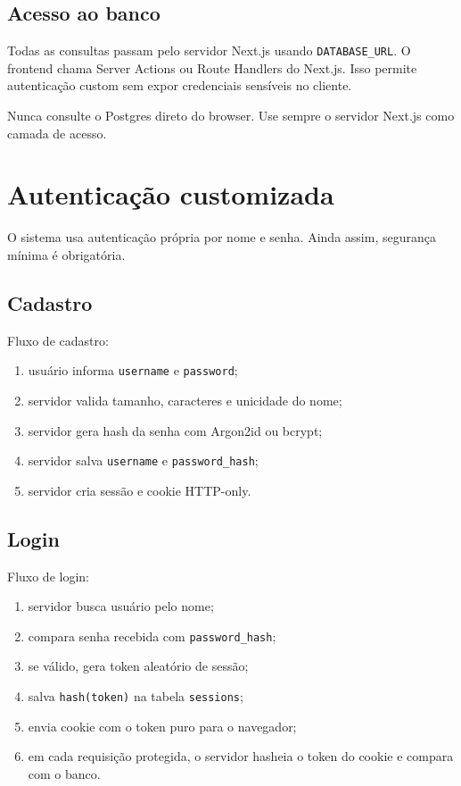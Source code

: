 \documentclass[12pt,a4paper]{article}
\begin{document}
\subsection{Acesso ao banco}

Todas as consultas passam pelo servidor Next.js usando \texttt{DATABASE\_URL}. O frontend chama Server Actions ou Route Handlers do Next.js. Isso permite autenticação custom sem expor credenciais sensíveis no cliente.

\begin{okbox}
Nunca consulte o Postgres direto do browser. Use sempre o servidor Next.js como camada de acesso.
\end{okbox}

\section{Autenticação customizada}

O sistema usa autenticação própria por nome e senha. Ainda assim, segurança mínima é obrigatória.

\subsection{Cadastro}

Fluxo de cadastro:
\begin{enumerate}
  \item usuário informa \texttt{username} e \texttt{password};
  \item servidor valida tamanho, caracteres e unicidade do nome;
  \item servidor gera hash da senha com Argon2id ou bcrypt;
  \item servidor salva \texttt{username} e \texttt{password\_hash};
  \item servidor cria sessão e cookie HTTP-only.
\end{enumerate}

\subsection{Login}

Fluxo de login:
\begin{enumerate}
  \item servidor busca usuário pelo nome;
  \item compara senha recebida com \texttt{password\_hash};
  \item se válido, gera token aleatório de sessão;
  \item salva \texttt{hash(token)} na tabela \texttt{sessions};
  \item envia cookie com o token puro para o navegador;
  \item em cada requisição protegida, o servidor hasheia o token do cookie e compara com o banco.
\end{enumerate}
\end{document}
